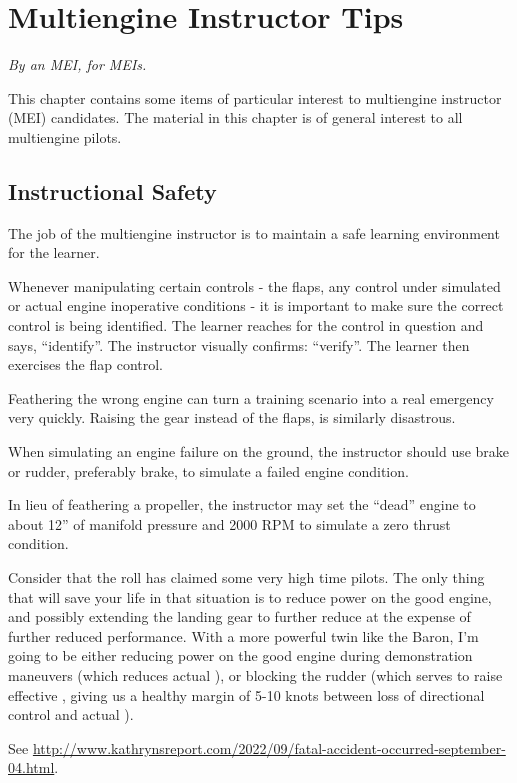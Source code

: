
\chapter{Multiengine Instructor Tips}

\emph{By an MEI, for MEIs.}

This chapter contains some items of particular interest to multiengine instructor (MEI) candidates.
The material in this chapter is of general interest to all multiengine pilots.

\section{Instructional Safety}

The job of the multiengine instructor is to maintain a safe learning environment for the learner.

Whenever manipulating certain controls - the flaps, any control under simulated or actual engine inoperative conditions -
it is important to make sure the correct control is being identified. The learner reaches for the control in question and
says, ``identify''. The instructor visually confirms: ``verify''. The learner then exercises the flap control.

Feathering the wrong engine can turn a training scenario into a real emergency very quickly. Raising the gear
instead of the flaps, is similarly disastrous.

When simulating an engine failure on the ground, the instructor should use brake or rudder, preferably brake,
to simulate a failed engine condition.

In lieu of feathering a propeller, the instructor may set the ``dead'' engine to about 12'' of manifold pressure
and 2000 RPM to simulate a zero thrust condition.

Consider that the \vmc roll has claimed some very high time pilots. The only thing that will save your life in that
situation is to reduce power on the good engine, and possibly extending the landing gear to further reduce \vmc at the
expense of further reduced performance. With a more powerful twin like the Baron, I'm going to be either reducing power
on the good engine during \vmc demonstration maneuvers (which reduces actual \vmc), or blocking the rudder (which
serves to raise effective \vmc, giving us a healthy margin of 5-10 knots between loss of directional control and actual \vmc).

See \url{http://www.kathrynsreport.com/2022/09/fatal-accident-occurred-september-04.html}.

